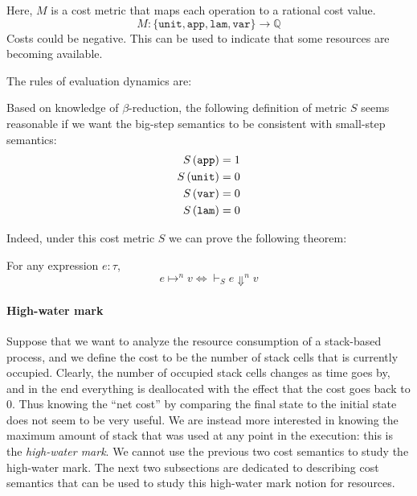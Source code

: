 \documentclass[ manuscript,screen, nonacm]{acmart}
\begin{document}
Here, \(M\) is a cost metric that maps each operation to a rational cost value.
\[
M: \{ \mathtt{unit, app, lam, var} \} \rightarrow \mathbb{Q}
\] 
Costs could be negative. This can be used to indicate that some resources are becoming available.

The rules of evaluation dynamics are:

Based on knowledge of $\beta$-reduction, the following definition of metric $S$ seems reasonable if we want the big-step semantics to be consistent with small-step semantics:
\begin{align}
S\left(\mathtt{app}\right)&=1 \\
S\left(\mathtt{unit}\right) &=0 \\
S\left(\mathtt{var}\right) &=0 \\
S\left(\mathtt{lam}\right) &=0
\end{align}

Indeed, under this cost metric $S$ we can prove the following theorem: 
\begin{theorem}\label{eq-big-small}
  For any expression \(e : \tau\),
  \[
  e \mapsto^n v \iff \vdash_S e \Downarrow^n v
  \]
\end{theorem}

\paragraph{High-water mark} 
Suppose that we want to analyze the resource consumption of a stack-based process, 
and we define the cost to be the number of stack cells that is currently occupied.
Clearly, the number of occupied stack cells changes as time goes by, and in the end everything 
is deallocated with the effect that the cost goes back to \(0\). 
Thus knowing the ``net cost'' by comparing the final state to the initial state does not seem to be very useful.
We are instead more interested in knowing the maximum amount of stack that
was used at any point in the execution: this is the \emph{high-water mark}.
We cannot use the previous two cost semantics to study the high-water mark.
%
The next two subsections are dedicated to describing cost semantics that 
can be used to study this high-water mark notion for resources.
\end{document}
